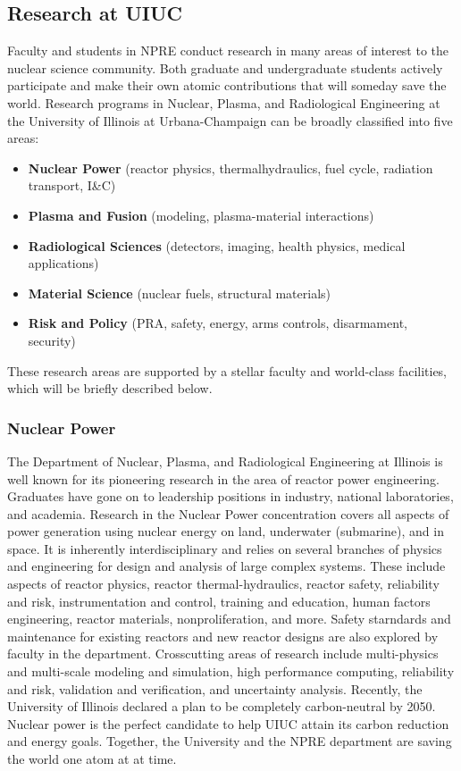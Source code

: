 \subsection{Research at UIUC}
Faculty and students in NPRE conduct research in many areas of interest to the nuclear science community. Both graduate and undergraduate  students actively participate and make their own atomic contributions that will someday save the world.
Research programs in Nuclear, Plasma, and Radiological Engineering at the University of Illinois at Urbana-Champaign can be
broadly classified into five areas:
\begin{itemize}
        \item \textbf{Nuclear Power} (reactor physics, thermalhydraulics, fuel cycle, radiation transport, I\&C)
        \item \textbf{Plasma and Fusion} (modeling, plasma-material interactions)
        \item \textbf{Radiological Sciences} (detectors, imaging, health physics, medical applications)
        \item \textbf{Material Science} (nuclear fuels, structural materials)
        \item \textbf{Risk and Policy} (PRA, safety, energy, arms controls, disarmament, security)
\end{itemize}

These research areas are supported by a stellar faculty and world-class facilities, which 
will be briefly described below.

\subsubsection{Nuclear Power}
The Department of Nuclear, Plasma, and Radiological Engineering at Illinois is well known for its pioneering research in the area of reactor power engineering. Graduates have gone on to leadership positions in industry, national laboratories, and academia. Research in the Nuclear Power concentration covers all aspects of power generation using nuclear energy on land, underwater (submarine), and in space. It is inherently interdisciplinary and relies on several branches of physics and engineering for design and analysis of large complex systems. These include aspects of reactor physics, reactor thermal-hydraulics, reactor safety, reliability and risk, instrumentation and control, training and education, human factors engineering, reactor materials, nonproliferation, and more. Safety starndards and maintenance for existing reactors and new reactor designs are also explored by faculty in the department. Crosscutting areas of research include multi-physics and multi-scale modeling and simulation, high performance computing, reliability and risk, validation and verification, and uncertainty analysis. Recently, the University of Illinois declared a plan to be completely carbon-neutral by 2050. Nuclear power is the perfect candidate to help UIUC attain its carbon reduction and energy goals. Together, the University and the NPRE department are saving the world one atom at at time.


